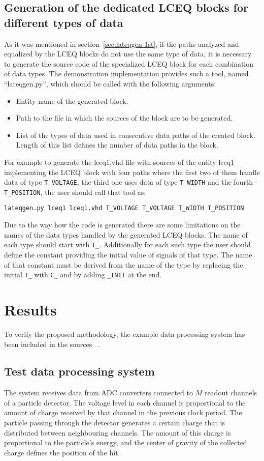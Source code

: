 \documentclass[preprint,11pt]{elsarticle}
\newcommand{\wzcite}[1]{ \cite{#1}}
\begin{document}
\subsection{Generation of the dedicated LCEQ blocks for different types of data}
\label{sec:lceq-generation}
As it was mentioned in section~\ref{sec:lateqgen-1st}, if the paths analyzed and equalized by the LCEQ blocks do not use the same type of data, it is necessary to generate the source code of the specialized LCEQ block for each combination of
data types.
The demonstration implementation provides such a tool, named ``lateqgen.py'', which
 should be called with the following arguments:
\begin{itemize}
 \item Entity name of the generated block.
 \item Path to the file in which the sources of the block are to be generated.
 \item List of the types of data used in consecutive data paths of the created block. Length of this list defines the number of data paths in the block.
\end{itemize}
For example to generate the lceq1.vhd file with sources of the entity lceq1 
implementing the LCEQ block with four paths where the first two of them handle 
data of type \verb|T_VOLTAGE|, the third one uses data of type \verb|T_WIDTH| and the fourth - \verb|T_POSITION|, the user should call that tool as:

\verb|lateqgen.py lceq1 lceq1.vhd T_VOLTAGE T_VOLTAGE T_WIDTH T_POSITION|	
	
Due to the way how the code is generated there are some limitations on the names 
of the data types handled by the generated LCEQ blocks.
The name of each type should start with \verb|T_|. Additionally for each such type 
the user should define the constant providing the initial value of signals
of that type. The name of that constant must be derived from the name of the type
by replacing the initial \verb|T_| with \verb|C_| and by adding \verb|_INIT| at the end.

	
\section{Results}
\label{sec:example-system}
To verify the proposed methodology, the example 
data processing system has been included in the sources~\wzcite{url-opencores-lateq}.
\subsection{Test data processing system}
The system receives data from ADC converters connected to $M$ readout channels 
of a particle detector. The voltage level in each channel is proportional
to the amount of charge received by that channel in the previous clock period.
The particle passing through the detector generates a certain charge that is distributed
between neighbouring channels. The amount of this charge is proportional to the particle's energy, and the center of gravity of the collected charge defines the position of the hit.
\end{document}

